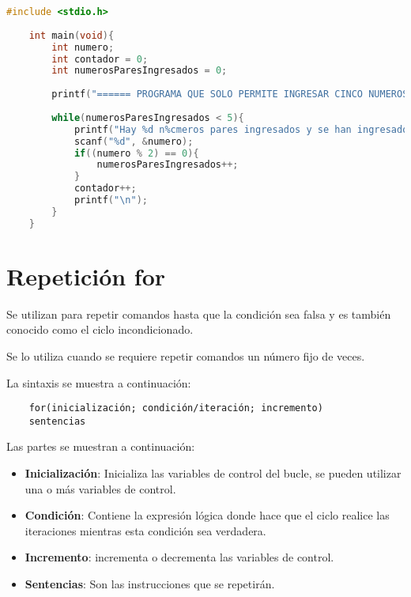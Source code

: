 \begin{lstlisting}[language=C, caption={Ingreso de cinco números pares}, style=codigoenc]
	#include <stdio.h>
	
	int main(void){
		int numero;
		int contador = 0;
		int numerosParesIngresados = 0;
		
		printf("====== PROGRAMA QUE SOLO PERMITE INGRESAR CINCO NUMEROS PARES ======\n\n");
		
		while(numerosParesIngresados < 5){
			printf("Hay %d n%cmeros pares ingresados y se han ingresado en total %d n%cmeros, ingrese el siguiente n%cmero: ", numerosParesIngresados, 163, contador, 163, 163);
			scanf("%d", &numero);
			if((numero % 2) == 0){
				numerosParesIngresados++;
			}
			contador++;
			printf("\n");
		}
	}
\end{lstlisting}

\section [Repetición for]{Repetición for}

Se utilizan para repetir comandos hasta que la condición sea falsa y es también conocido como el ciclo incondicionado.

\vspace{1em}
Se lo utiliza cuando se requiere repetir comandos un número fijo de veces.

\vspace{1em}
La sintaxis se muestra a continuación:

\begin{verbatim}
	for(inicialización; condición/iteración; incremento)
	sentencias
\end{verbatim}

\space{1em}
Las partes se muestran a continuación:

\begin{itemize}
	\item \textbf{Inicialización}: Inicializa las variables de control del bucle, se pueden utilizar una o más variables de control.
	\item \textbf{Condición}: Contiene la expresión lógica donde hace que el ciclo realice las iteraciones mientras esta condición sea verdadera.
	\item \textbf{Incremento}: incrementa o decrementa las variables de control.
	\item \textbf{Sentencias}: Son las instrucciones que se repetirán.
\end{itemize}

